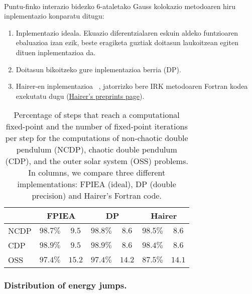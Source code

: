 \paragraph*{}Puntu-finko interazio bidezko $6$-ataletako Gauss kolokazio metodoaren hiru inplementazio konparatu ditugu:

\begin{enumerate}
\item Inplementazio ideala. Ekuazio diferentzialaren eskuin aldeko funtzioaren ebaluazioa izan ezik, beste eragiketa guztiak doitasun laukoitzean egiten dituen inplementazioa da.

\item Doitasun bikoitzeko gure inplementazioa berria (DP).

\item Hairer-en inplementazioa ~\cite{Hairer2008}, jatorrizko bere IRK metodoaren Fortran kodea exekutatu dugu (\href{http://www.unige.ch/~hairer/preprints.html}{Hairer's preprints page}).     

\end{enumerate}

\begin{table}
\caption[Fixed-point percentage of steps and mean iterations.] 
{\small{Percentage of steps that reach a computational fixed-point and the number of fixed-point iterations per step for the computations of non-chaotic double pendulum (NCDP), chaotic double pendulum (CDP), and the outer solar system (OSS) problems. In columns, we compare three different implementations: FPIEA (ideal), DP (double precision) and Hairer's Fortran code.}}
\label{tab:fp}       %
\centering
{%
\begin{tabular}{ l c c c c c c } 
 \hline
                 &  \multicolumn{2}{c}{FPIEA}  & \multicolumn{2}{c}{DP} & \multicolumn{2}{c}{Hairer} \\
 \hline
 NCDP            & $98.7\%$    & $9.5$   & $98.8\%$     & $8.6$   &  $98.5\%$ & $8.6$  \\ 
 CDP             & $98.9\%$    & $9.5$   & $98.9\%$     & $8.6$   &  $98.4\%$ & $8.6$  \\ 
 OSS             & $97.4\%$    & $15.2$  & $97.4\%$     & $14.2$  &  $87.5\%$ & $14.1$ \\ 
   \hline
 \end{tabular}}
 \end{table}


\subsubsection*{Distribution of energy jumps.}

